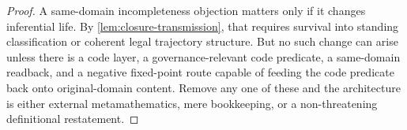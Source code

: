 \begin{proof}
A same-domain incompleteness objection matters only if it changes inferential life. By \cref{lem:closure-transmission}, that requires survival into standing classification or coherent legal trajectory structure. But no such change can arise unless there is a code layer, a governance-relevant code predicate, a same-domain readback, and a negative fixed-point route capable of feeding the code predicate back onto original-domain content. Remove any one of these and the architecture is either external metamathematics, mere bookkeeping, or a non-threatening definitional restatement.
\end{proof}
